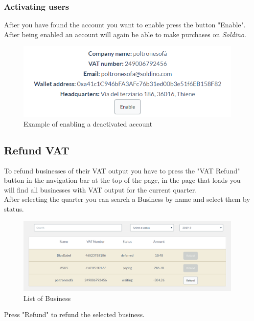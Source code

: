 		\subsubsection{Activating users}
		After you have found the account you want to enable press the button 
		"Enable". After being enabled an account will again be able to make 
		purchases on \textit{Soldino}.
		\begin{figure}[H]
			\includegraphics[width=15cm]{res/images/user_enable.png}
			\centering
			\caption{Example of enabling a deactivated account}
		\end{figure}
	\subsection{Refund VAT}
	To refund businesses of their VAT output you have to press the "VAT 
	Refund" button in the navigation bar at the top of the page, in the 
	page that loads you will find all businesses with VAT output for the 
	current quarter.\\
	After selecting the quarter you can search a Business by name and select 
	them by status.
	\begin{figure}[H]
		\includegraphics[width=15cm]{res/images/business_list.png}
		\centering
		\caption{List of Business}
	\end{figure}
	\noindent Press "Refund" to refund the selected business.\\
